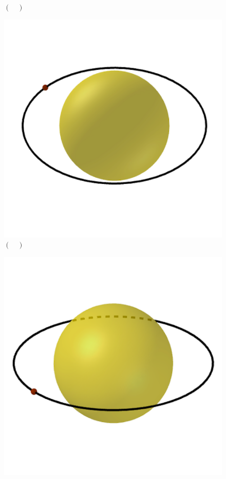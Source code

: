 \documentclass[a4paper, 12pt]{article}
\begin{document}
\begin{flushleft}
\begin{itemize}
\begin{itemize}
\begin{multicols}{3}
\begin{figure}[H]
							\captionsetup{labelformat=empty}
							\caption{$(\quad)$}
						\end{figure}
						\begin{figure}[H]
							\centering
							\includegraphics[scale=0.2]{./img/5b2.png}
							\captionsetup{labelformat=empty}
							\caption{$(\quad)$}
						\end{figure}
						\begin{figure}[H]
							\centering
							\includegraphics[scale=0.2]{./img/5b3.png}

\end{figure}
\end{multicols}
\end{itemize}
\end{itemize}
\end{flushleft}
\end{document}
